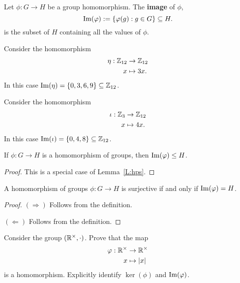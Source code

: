 \documentclass{ximera}
\begin{document}
\begin{definition}
  Let $\phi:G\to H$ be a group homomorphism. The \textbf{image} of
  $\phi$,
  \[
  \operatorname{Im}(\varphi) := \{\varphi(g): g\in G\}\subseteq H.
  \]
  is the subset of $H$ containing all the values of $\phi$.
\end{definition}

\begin{example}
  Consider the homomorphism
  \begin{align*}
    \eta:\mathbb Z_{12} &\to \mathbb Z_{12}\\
    x &\mapsto 3x.
  \end{align*}
  In this case $\operatorname{Im}(\eta) = \{0,3,6,9\}\subseteq \mathbb Z_{12}$.
\end{example}

\begin{example}\label{E:I1} 
  Consider the homomorphism
  \begin{align*}
    \iota:\mathbb Z_{3} &\to \mathbb Z_{12}\\
    x &\mapsto 4x.
  \end{align*}
  In this case $\operatorname{Im}(\iota) = \{0,4,8\}\subseteq \mathbb Z_{12}$.
\end{example}


\begin{lemma}
  If $\phi:G\to H$ is a homomorphism of groups, then $\operatorname{Im}(\varphi)\leq H$.
  \begin{proof}
    This is a special case of Lemma~\ref{L:hps}.
  \end{proof}
\end{lemma}


\begin{lemma}
    A homomorphism of groups $\phi:G\to H$ is surjective if and only
    if $\operatorname{Im}(\varphi) = H$.
    \begin{proof}
      $(\Rightarrow)$ Follows from the definition.

      $(\Leftarrow)$ Follows from the definition.
    \end{proof}
\end{lemma}


\begin{exercise}
  Consider the group $(\mathbb R^\times,\cdot)$. Prove that
  the map
  \begin{align*}
    \varphi:\mathbb R^\times &\to \mathbb R^\times\\
    x &\mapsto |x|
  \end{align*}
  is a homomorphism. Explicitly identify $\ker(\phi)$ and
  $\operatorname{Im}(\varphi)$.
\end{exercise}
\end{document}
